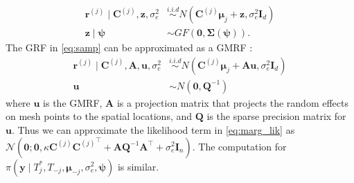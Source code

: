 \documentclass{article}
\begin{document}
{\begin{equation}
\begin{aligned}
\boldsymbol{r}^{(j)} \mid {\mathbf{C}^{(j)}}, \boldsymbol{z}, \sigma_e^2 &\stackrel{i . i . d}{\sim} N\left({\mathbf{C}^{(j)}} \boldsymbol{\mu}_j+\boldsymbol{z}, \sigma_e^2\mathbf{I}_{d} \right) \\
	\boldsymbol{z} \mid \boldsymbol{\psi} &\sim GF(\boldsymbol{0}, \boldsymbol{\Sigma}(\boldsymbol{\psi})).
\end{aligned}
\label{eq:samp2}
\end{equation} 
The GRF in \eqref{eq:samp} can be approximated as a GMRF \citep{lindgren2011explicit}:
\begin{equation} 
\begin{aligned}
\boldsymbol{r}^{(j)} \mid {\mathbf{C}^{(j)}}, \mathbf{A}, \boldsymbol{u}, \sigma_e^2 &\stackrel{i . i . d}{\sim} N\left({\mathbf{C}^{(j)}} \boldsymbol{\mu}_j+\mathbf{A}\boldsymbol{u}, \sigma_e^2\mathbf{I}_{d} \right) \\
	\boldsymbol{u}&\sim N(\boldsymbol{0}, \mathbf{Q}^{-1})
\end{aligned}
\label{eq:samp3}
\end{equation}
where $\boldsymbol{u}$ is the GMRF, $\mathbf{A}$ is a projection matrix that projects the random effects on mesh points to the spatial locations, and $\mathbf{Q}$ is the sparse precision matrix for $\boldsymbol{u}$. Thus we can approximate the likelihood term in \eqref{eq:marg_lik} as $\mathcal{N}\left(\mathbf{0} ; \mathbf{0}, \kappa {\mathbf{C}^{(j)}} {\mathbf{C}^{(j)}}^{\top}+\mathbf{A}\mathbf{Q}^{-1}\mathbf{A}^\intercal+\sigma_e^2 \mathbf{I}_n\right)$. The computation for $\pi\left(\boldsymbol{y} \mid T_j^*, T_{-j}, \boldsymbol{\mu}_{-j}, \sigma_e^2, \boldsymbol{\psi}\right)$ is similar.
}
\end{document}
